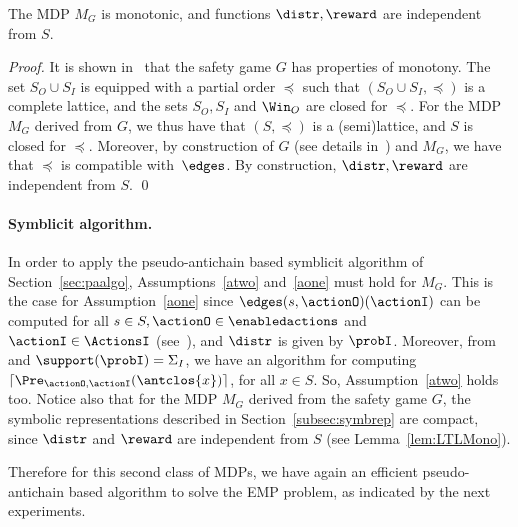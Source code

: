 \begin{lemma}  \label{lem:LTLMono}
The MDP $M_G$ is monotonic, and functions $\distr, \reward$ are independent from $S$. 
\end{lemma}

\begin{proof}
It is shown in~\cite{DBLP:journals/corr/abs-1210-3539,DBLP:conf/tacas/BohyBFR13} that the safety game $G$ has properties of monotony. The set $S_O\cup S_I$ is equipped with a partial order $\preceq$ such that $(S_O\cup S_I, \preceq)$ is a complete lattice, and the sets $S_O, S_I$ and $\Win_O$ are closed for $\preceq$. For the MDP $M_G$ derived from $G$, we thus have that $(S, \preceq)$ is a (semi)lattice, and $S$ is closed for $\preceq$. Moreover, by construction of $G$ (see details in~\cite[Sec. 5.1]{DBLP:journals/corr/abs-1210-3539}) and $M_G$, 
we have that $\preceq$ is compatible with~$\edges$. By construction, $\distr, \reward$ are independent from $S$.
\qed\end{proof}


\paragraph{Symblicit algorithm.} 
In order to apply the pseudo-antichain based symblicit algorithm of Section~\ref{sec:paalgo}, Assumptions~\ref{atwo} and~\ref{aone} must hold for $M_G$. This is the case for Assumption~\ref{aone} since $\edges(s, \actionO)(\actionI)$ can be computed for all $s\in S, \actionO \in \enabledactions$ and $\actionI \in \ActionsI$ (see~\cite[Sec. 5.1]{DBLP:journals/corr/abs-1210-3539}), and $\distr$ is given by $\probI$. Moreover, from \cite[Prop. 24]{DBLP:journals/corr/abs-1210-3539} and $\support(\probI) = \Sigma_I$, we have an algorithm for computing $\lceil \Pre_{\actionO,\actionI}(\antclos \{x\})\rceil$, for all $x \in S$. So, Assumption~\ref{atwo} holds too. 
Notice also that for the MDP $M_G$ derived from the safety game $G$, the symbolic representations described in Section~\ref{subsec:symbrep} are compact, since $\distr$ and $\reward$ are independent from $S$ (see Lemma~\ref{lem:LTLMono}).

Therefore for this second class of MDPs, we have again an efficient pseudo-antichain based algorithm to solve the EMP problem, as indicated by the next experiments.

